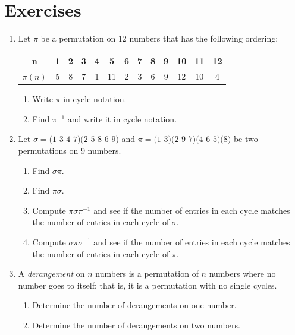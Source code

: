 \documentclass{book}
\theoremstyle{plain}
\theoremstyle{definition}
\newif\ifprintsolutions
\newcommand{\solution}[1]{\ifprintsolutions \begin{sloppypar}{\it #1}\end{sloppypar} \fi} %
\begin{document}
\section{Exercises}
\begin{enumerate}
\item Let $\pi$ be a permutation on 12 numbers that has the following ordering:
\begin{center}
\begin{tabular}{|c|cccccccccccc|}
\hline
n & 1 & 2 & 3 & 4 & 5 & 6 & 7 & 8 & 9 & 10 & 11 & 12 \\
\hline
$\pi(n)$ & 5 & 8 & 7 & 1 & 11 & 2 & 3 & 6 & 9 & 12 & 10 & 4 \\
\hline
\end{tabular}
\end{center}
\begin{enumerate}
\item Write $\pi$ in cycle notation. \solution{$\pi = \text{(1 5 11 10 12 14)(2 8 6)(3 7)(9)}$}
\item Find $\pi^{-1}$ and write it in cycle notation. \solution{$\pi^{-1} = \text{(1 4 12 10 11 5)(2 6 8)(3 7)(9)}$}
\end{enumerate}
\item Let $\sigma = \text{(1 3 4 7)(2 5 8 6 9)}$ and $\pi = \text{(1 3)(2 9 7)(4 6 5)(8)}$ be two permutations on 9 numbers.
\begin{enumerate}
\item Find $\sigma\pi$. \solution{$\text{(1 4 9)(2)(3)(5 7)(6 8)}$}
\item Find $\pi\sigma$. \solution{$\text{(1)(2 4)(3 6 7)(5 8)(9)}$}
\item Compute $\pi\sigma\pi^{-1}$ and see if the number of entries in each cycle matches the number of entries in each cycle of $\sigma$. \solution{$\text{(1 6 2 3)(4 8 5 7 9)}$}
\item Compute $\sigma\pi\sigma^{-1}$ and see if the number of entries in each cycle matches the number of entries in each cycle of $\pi$. \solution{$\text{(1 5 2)(3 4)(6)(7 9 8)}$}
\end{enumerate}
\item A {\it derangement} on $n$ numbers is a permutation of $n$ numbers where no number goes to itself; that is, it is a permutation with no single cycles.
\begin{enumerate}
\item Determine the number of derangements on one number. \solution{There are no such derangements.}
\item Determine the number of derangements on two numbers. \solution{There is one such derangement.}

\end{enumerate}
\end{enumerate}
\end{document}
